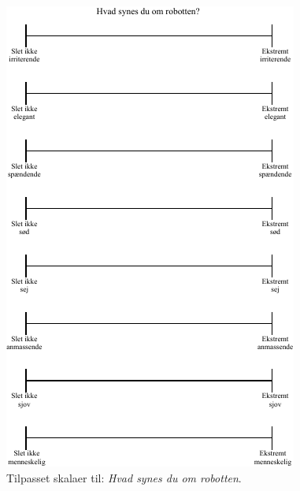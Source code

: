 \begin{figure}[H]
\centering
\includegraphics[width =\textwidth]{Figure/TilpasningAfSkalaer/HvadSynesDuOmR} 
\caption{Tilpasset skalaer til: \textit{Hvad synes du om robotten}.}
\label{fig:TilpasningHvadSynesDuOmR}
\end{figure}
\noindent
%

